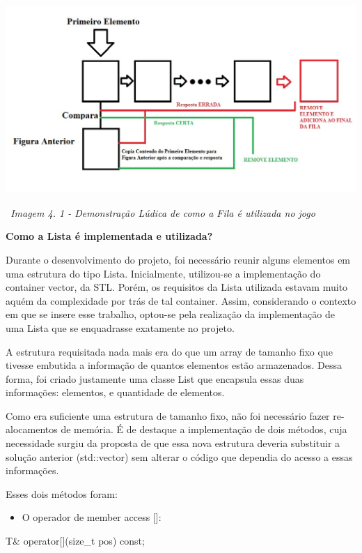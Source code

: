 \documentclass[a4paper]{article}
\newcommand\liststyleWWNumvi{%
\renewcommand\labelitemi{[F0B7?]}
\renewcommand\labelitemii{o}
\renewcommand\labelitemiii{[F0A7?]}
\renewcommand\labelitemiv{[F0B7?]}
}
\newcounter{Imagem2}
\newcounter{Imagem1}
\begin{document}
{\centering\itshape\color[rgb]{0.26666668,0.32941177,0.41568628}
 \includegraphics[width=5.8957in,height=3.1165in]{T1-img14.jpg} 
\ Imagem 4. 1 - Demonstração Lúdica de como a Fila é utilizada no jogo
\par}


\bigskip


\bigskip

\textbf{Como a Lista é implementada e utilizada?}

Durante o desenvolvimento do projeto, foi necessário reunir alguns
elementos em uma estrutura do tipo Lista. Inicialmente, utilizou-se a
implementação do container vector, da STL. Porém, os requisitos da
Lista utilizada estavam muito aquém da complexidade por trás de tal
container. Assim, considerando o contexto em que se insere esse
trabalho, optou-se pela realização da implementação de uma Lista que se
enquadrasse exatamente no projeto. 

A estrutura requisitada nada mais era do que um array de tamanho fixo
que tivesse embutida a informação de quantos elementos estão
armazenados. Dessa forma, foi criado justamente uma classe List que
encapsula essas duas informações: elementos, e quantidade de elementos.

Como era suficiente uma estrutura de tamanho fixo, não foi necessário
fazer re-alocamentos de memória. É de destaque a implementação de dois
métodos, cuja necessidade surgiu da proposta de que essa nova estrutura
deveria substituir a solução anterior (std::vector) sem alterar o
código que dependia do acesso a essas informações.

Esses dois métodos foram:

\liststyleWWNumvi
\begin{itemize}
\item O operador de member access []:
\end{itemize}
\foreignlanguage{english}{\textcolor[rgb]{0.3254902,0.5058824,0.20784314}{T\&
}}\foreignlanguage{english}{\textcolor[rgb]{0.3372549,0.6117647,0.8392157}{operator}}\foreignlanguage{english}{\textcolor[rgb]{0.7058824,0.7058824,0.7058824}{[](}}\foreignlanguage{english}{\textcolor[rgb]{0.3254902,0.5058824,0.20784314}{size\_t
pos}}\foreignlanguage{english}{\textcolor[rgb]{0.7058824,0.7058824,0.7058824}{)}}\foreignlanguage{english}{\textcolor[rgb]{0.8627451,0.8627451,0.8627451}{
}}\foreignlanguage{english}{\textcolor[rgb]{0.3372549,0.6117647,0.8392157}{const;}}
\end{document}
